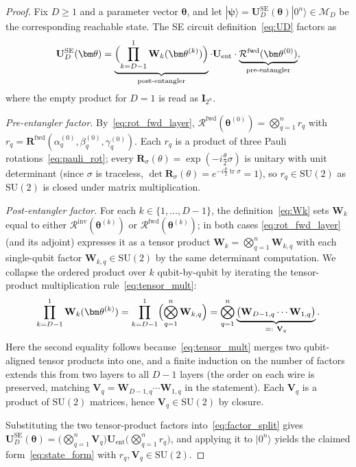 \documentclass[11pt]{article}
\newcommand{\SU}{\mathrm{SU}}
\newcommand{\cM}{\mathcal{M}}
\theoremstyle{plain}
\theoremstyle{plain}
\begin{document}
\begin{proof}
Fix $D\ge 1$ and a parameter vector $\bm\theta$, and let
$|\boldsymbol{\psi}\rangle=\mathbf{U}_D^{\mathrm{SE}}(\bm\theta)|0^n\rangle\in\cM_D$
be the corresponding reachable state. The SE circuit
definition~\eqref{eq:UD} factors as
\begin{equation}\label{eq:factor_split}
  \mathbf{U}_D^{\mathrm{SE}}(\bm\theta)
  = \underbrace{\Bigl(\prod_{k=D-1}^{1}\mathbf{W}_k(\bm\theta^{(k)})\Bigr)}_{
      \text{post-entangler}}
    \cdot \mathbf{U}_{\mathrm{ent}}\cdot
    \underbrace{\mathcal{R}^{\mathrm{fwd}}(\bm\theta^{(0)})}_{
      \text{pre-entangler}},
\end{equation}
where the empty product for $D=1$ is read as $\mathbf{I}_{2^n}$.

\emph{Pre-entangler factor.} By~\eqref{eq:rot_fwd_layer},
$\mathcal{R}^{\mathrm{fwd}}(\bm\theta^{(0)})=\bigotimes_{q=1}^n r_q$ with
$r_q=\mathbf{R}^{\mathrm{fwd}}(\alpha_q^{(0)},\beta_q^{(0)},\gamma_q^{(0)})$.
Each $r_q$ is a product of three Pauli rotations~\eqref{eq:pauli_rot};
every $\mathbf{R}_\sigma(\theta)=\exp(-i\tfrac{\theta}{2}\sigma)$ is unitary
with unit determinant (since $\sigma$ is traceless,
$\det\mathbf{R}_\sigma(\theta)=e^{-i\frac{\theta}{2}\operatorname{tr}\sigma}=1$),
so $r_q\in\SU(2)$ as $\SU(2)$ is closed under matrix multiplication.

\emph{Post-entangler factor.} For each $k\in\{1,\dots,D-1\}$, the
definition~\eqref{eq:Wk} sets $\mathbf{W}_k$ equal to either
$\mathcal{R}^{\mathrm{inv}}(\bm\theta^{(k)})$ or
$\mathcal{R}^{\mathrm{fwd}}(\bm\theta^{(k)})$; in both cases
\eqref{eq:rot_fwd_layer} (and its adjoint) expresses it as a tensor
product $\mathbf{W}_k=\bigotimes_{q=1}^n \mathbf{W}_{k,q}$ with each single-qubit
factor $\mathbf{W}_{k,q}\in\SU(2)$ by the same determinant computation. We
collapse the ordered product over $k$ qubit-by-qubit by iterating the
tensor-product multiplication rule~\eqref{eq:tensor_mult}:
\begin{equation}\label{eq:factor_post}
  \prod_{k=D-1}^{1}\mathbf{W}_k(\bm\theta^{(k)})
  = \prod_{k=D-1}^{1}\Bigl(\bigotimes_{q=1}^n \mathbf{W}_{k,q}\Bigr)
  = \bigotimes_{q=1}^n
    \underbrace{\bigl(\mathbf{W}_{D-1,q}\cdots\mathbf{W}_{1,q}\bigr)}_{=:~\mathbf{V}_q}.
\end{equation}
Here the second equality follows because~\eqref{eq:tensor_mult} merges
two qubit-aligned tensor products into one, and a finite induction on
the number of factors extends this from two layers to all $D-1$ layers
(the order on each wire is preserved, matching
$\mathbf{V}_q=\mathbf{W}_{D-1,q}\cdots\mathbf{W}_{1,q}$ in the statement). Each $\mathbf{V}_q$ is a
product of $\SU(2)$ matrices, hence $\mathbf{V}_q\in\SU(2)$ by closure.

Substituting the two tensor-product factors into~\eqref{eq:factor_split}
gives
$\mathbf{U}_D^{\mathrm{SE}}(\bm\theta)
=\bigl(\bigotimes_{q=1}^n \mathbf{V}_q\bigr) \mathbf{U}_{\mathrm{ent}} 
\bigl(\bigotimes_{q=1}^n r_q\bigr)$, and applying it to $|0^n\rangle$
yields the claimed form~\eqref{eq:state_form} with $r_q,\mathbf{V}_q\in\SU(2)$.
\end{proof}
\end{document}
